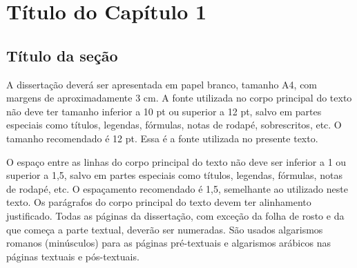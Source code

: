 \documentclass[a4paper,12pt,oneside]{book}
\begin{document}
\listoffigures

\newpage

\listoftables

\newpage

\renewcommand{\contentsname}{Sumário}

\tableofcontents

\newpage

\chapter{Título do Capítulo 1}

\section{Título da seção}

A dissertação deverá ser apresentada em papel branco, tamanho A4, com
margens de aproximadamente 3 cm. A fonte utilizada no corpo principal do texto não
deve ter tamanho inferior a 10 pt ou superior a 12 pt, salvo em partes especiais como
títulos, legendas, fórmulas, notas de rodapé, sobrescritos, etc. O tamanho recomendado
é 12 pt. Essa é a fonte utilizada no presente texto.

O espaço entre as linhas do corpo principal do texto não deve ser inferior a 1 ou
superior a 1,5, salvo em partes especiais como títulos, legendas, fórmulas, notas de
rodapé, etc. O espaçamento recomendado é 1,5, semelhante ao utilizado neste texto. Os
parágrafos do corpo principal do texto devem ter alinhamento justificado.
Todas as páginas da dissertação, com exceção da folha de rosto e da que começa
a parte textual, deverão ser numeradas. São usados algarismos romanos (minúsculos)
para as páginas pré-textuais e algarismos arábicos nas páginas textuais e pós-textuais.
\end{document}
